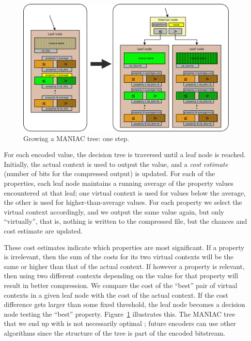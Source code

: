 \documentclass{article}
\begin{document}
\begin{figure}
\includegraphics[width=\linewidth]{images/context_split}
\caption{Growing a MANIAC tree: one step.}
\label{fig:context_tree_split}
\end{figure}


For each encoded value, the decision tree is traversed until a leaf node is reached.
Initially, the actual context is used to output the value, and a {\it cost estimate} (number of bits for the compressed output) is updated.
For each of the properties, each leaf node maintains a running average of the property values encountered at that leaf;
one virtual context is used for values below the average, the other is used for higher-than-average values.
For each property we select the virtual context accordingly,
and we output the same value again, but only ``virtually'', that is,
nothing is written to the compressed file, but the chances and cost estimate are updated.



These cost estimates indicate which properties are most significant.
If a property is irrelevant, then the sum of the costs for its two virtual contexts will be the same
or higher than that of the actual context. If however a property is relevant, then using two different
contexts depending on the value for that property will result in better compression.
We compare the cost of the ``best'' pair of virtual contexts in a given leaf node with the
cost of the actual context.
If the cost difference %
gets larger than some fixed
threshold, the leaf node becomes a decision node testing the ``best'' property.
Figure~\ref{fig:context_tree_split} illustrates this.
%
The MANIAC tree that we end up with is not necessarily optimal%
; future encoders can use other algorithms %
since the structure of the tree is part of the encoded bitstream.
\end{document}
